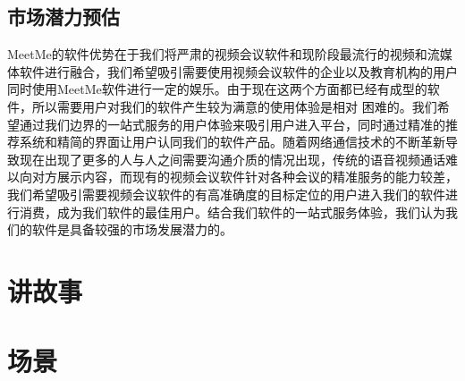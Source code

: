 \documentclass[a4paper,12pt]{article}
\begin{document}
    \subsection{市场潜力预估}
    MeetMe的软件优势在于我们将严肃的视频会议软件和现阶段最流行的视频和流媒体软件进行融合，我们希望吸引需要使用视频会议软件的企业以及教育机构的用户同时使用MeetMe软件进行一定的娱乐。由于现在这两个方面都已经有成型的软件，所以需要用户对我们的软件产生较为满意的使用体验是相对
    困难的。我们希望通过我们边界的一站式服务的用户体验来吸引用户进入平台，同时通过精准的推荐系统和精简的界面让用户认同我们的软件产品。随着网络通信技术的不断革新导致现在出现了更多的人与人之间需要沟通介质的情况出现，传统的语音视频通话难以向对方展示内容，而现有的视频会议软件针对各种会议的精准服务的能力较差，我们希望吸引需要视频会议软件的有高准确度的目标定位的用户进入我们的软件进行消费，成为我们软件的最佳用户。结合我们软件的一站式服务体验，我们认为我们的软件是具备较强的市场发展潜力的。
    \section{讲故事}
    \section{场景}
\end{document}
